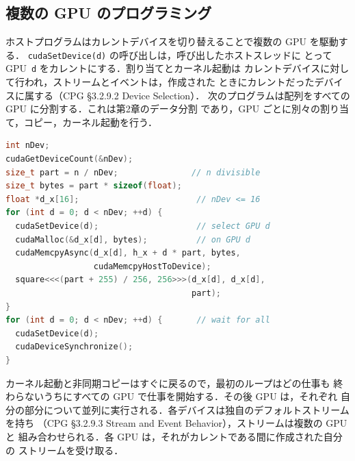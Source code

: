 \documentclass[../main.tex]{subfiles}
\begin{document}
\subsection{複数の GPU のプログラミング}

ホストプログラムはカレントデバイスを切り替えることで複数の GPU を駆動する．
\texttt{cudaSetDevice(d)} の呼び出しは，呼び出したホストスレッドに
とって GPU~\texttt{d} をカレントにする．割り当てとカーネル起動は
カレントデバイスに対して行われ，ストリームとイベントは，作成された
ときにカレントだったデバイスに属する（CPG §3.2.9.2 Device Selection）．
次のプログラムは配列をすべての GPU に分割する．これは第2章のデータ分割
であり，GPU ごとに別々の割り当て，コピー，カーネル起動を行う．

\begin{lstlisting}[language=C++, numbers=none]
int nDev;
cudaGetDeviceCount(&nDev);
size_t part = n / nDev;               // n divisible
size_t bytes = part * sizeof(float);
float *d_x[16];                        // nDev <= 16
for (int d = 0; d < nDev; ++d) {
  cudaSetDevice(d);                    // select GPU d
  cudaMalloc(&d_x[d], bytes);          // on GPU d
  cudaMemcpyAsync(d_x[d], h_x + d * part, bytes,
                  cudaMemcpyHostToDevice);
  square<<<(part + 255) / 256, 256>>>(d_x[d], d_x[d],
                                      part);
}
for (int d = 0; d < nDev; ++d) {       // wait for all
  cudaSetDevice(d);
  cudaDeviceSynchronize();
}
\end{lstlisting}

%
カーネル起動と非同期コピーはすぐに戻るので，最初のループはどの仕事も
終わらないうちにすべての GPU で仕事を開始する．その後 GPU は，それぞれ
自分の部分について並列に実行される．各デバイスは独自のデフォルトストリームを持ち
（CPG §3.2.9.3 Stream and Event Behavior），ストリームは複数の GPU と
組み合わせられる．各 GPU は，それがカレントである間に作成された自分の
ストリームを受け取る．
\end{document}
